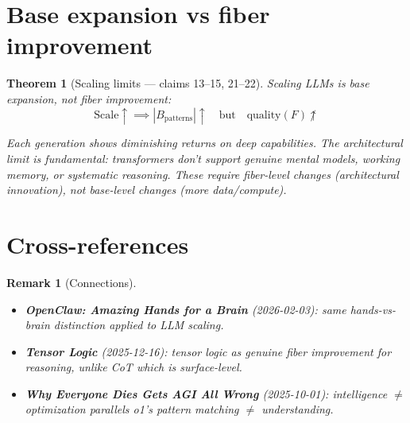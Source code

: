 \documentclass[11pt,a4paper]{article}
\newtheorem{theorem}[definition]{Theorem}
\newtheorem{remark}[definition]{Remark}
\begin{document}
\section{Base expansion vs fiber improvement}

\begin{theorem}[Scaling limits --- claims 13--15, 21--22]
Scaling LLMs is base expansion, not fiber improvement:
\[
  \text{Scale} \uparrow \implies |B_{\text{patterns}}| \uparrow
  \quad \text{but} \quad \text{quality}(F) \not\uparrow
\]

Each generation shows diminishing returns on deep capabilities. The
architectural limit is fundamental: transformers don't support genuine
mental models, working memory, or systematic reasoning. These require
fiber-level changes (architectural innovation), not base-level changes
(more data/compute).
\end{theorem}

\section{Cross-references}

\begin{remark}[Connections]
\begin{itemize}
\item \textbf{OpenClaw: Amazing Hands for a Brain} (2026-02-03): same
  hands-vs-brain distinction applied to LLM scaling.
\item \textbf{Tensor Logic} (2025-12-16): tensor logic as genuine fiber
  improvement for reasoning, unlike CoT which is surface-level.
\item \textbf{Why Everyone Dies Gets AGI All Wrong} (2025-10-01): intelligence
  $\neq$ optimization parallels o1's pattern matching $\neq$ understanding.
\end{itemize}
\end{remark}
\end{document}
